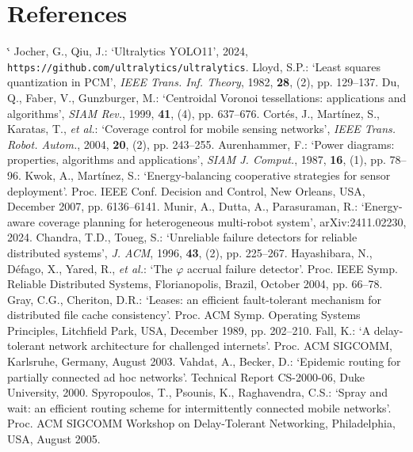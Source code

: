 \documentclass[10pt,a4paper,twocolumn]{article}
\makeatletter
\renewenvironment{thebibliography}[1]{\section{References}\list{\@biblabel{\@arabic\c@enumiv}}{\settowidth\labelwidth{\@biblabel{#1}}\leftmargin\labelwidth\advance\leftmargin\labelsep\setlength{\parsep}{0pt}\setlength{\itemsep}{2pt}\usecounter{enumiv}\let\p@enumiv\@empty\renewcommand\theenumiv{\@arabic\c@enumiv}}\sloppy\clubpenalty4000\@clubpenalty\clubpenalty\widowpenalty4000\sfcode`\.\@m}{\def\@noitemerr{\@latex@error{Empty thebibliography}\@ehc}\endlist}
\makeatother
\begin{document}
\begin{thebibliography}{99}
 Jocher, G., Qiu, J.: \textquoteleft{}Ultralytics YOLO11\textquoteright{}, 2024, \nolinkurl{https://github.com/ultralytics/ultralytics}.
 Lloyd, S.P.: \textquoteleft{}Least squares quantization in PCM\textquoteright{}, \textit{IEEE Trans. Inf. Theory}, 1982, \textbf{28}, (2), pp. 129--137.
 Du, Q., Faber, V., Gunzburger, M.: \textquoteleft{}Centroidal Voronoi tessellations: applications and algorithms\textquoteright{}, \textit{SIAM Rev.}, 1999, \textbf{41}, (4), pp. 637--676.
 Cort\'es, J., Mart\'inez, S., Karatas, T., \textit{et al.}: \textquoteleft{}Coverage control for mobile sensing networks\textquoteright{}, \textit{IEEE Trans. Robot. Autom.}, 2004, \textbf{20}, (2), pp. 243--255.
 Aurenhammer, F.: \textquoteleft{}Power diagrams: properties, algorithms and applications\textquoteright{}, \textit{SIAM J. Comput.}, 1987, \textbf{16}, (1), pp. 78--96.
 Kwok, A., Mart\'inez, S.: \textquoteleft{}Energy-balancing cooperative strategies for sensor deployment\textquoteright{}. Proc. IEEE Conf. Decision and Control, New Orleans, USA, December 2007, pp. 6136--6141.
 Munir, A., Dutta, A., Parasuraman, R.: \textquoteleft{}Energy-aware coverage planning for heterogeneous multi-robot system\textquoteright{}, arXiv:2411.02230, 2024.
 Chandra, T.D., Toueg, S.: \textquoteleft{}Unreliable failure detectors for reliable distributed systems\textquoteright{}, \textit{J. ACM}, 1996, \textbf{43}, (2), pp. 225--267.
 Hayashibara, N., D\'efago, X., Yared, R., \textit{et al.}: \textquoteleft{}The $\varphi$ accrual failure detector\textquoteright{}. Proc. IEEE Symp. Reliable Distributed Systems, Florianopolis, Brazil, October 2004, pp. 66--78.
 Gray, C.G., Cheriton, D.R.: \textquoteleft{}Leases: an efficient fault-tolerant mechanism for distributed file cache consistency\textquoteright{}. Proc. ACM Symp. Operating Systems Principles, Litchfield Park, USA, December 1989, pp. 202--210.
 Fall, K.: \textquoteleft{}A delay-tolerant network architecture for challenged internets\textquoteright{}. Proc. ACM SIGCOMM, Karlsruhe, Germany, August 2003.
 Vahdat, A., Becker, D.: \textquoteleft{}Epidemic routing for partially connected ad hoc networks\textquoteright{}. Technical Report CS-2000-06, Duke University, 2000.
 Spyropoulos, T., Psounis, K., Raghavendra, C.S.: \textquoteleft{}Spray and wait: an efficient routing scheme for intermittently connected mobile networks\textquoteright{}. Proc. ACM SIGCOMM Workshop on Delay-Tolerant Networking, Philadelphia, USA, August 2005.

\end{thebibliography}
\end{document}
